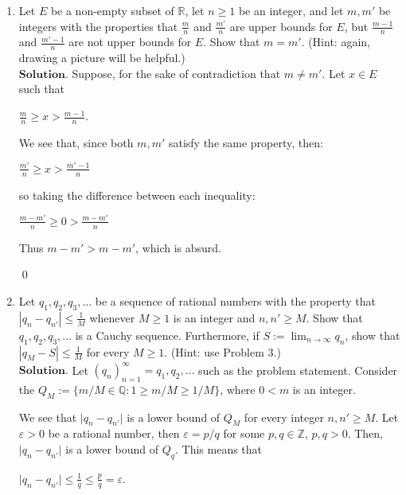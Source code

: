 \documentclass{article}
\theoremstyle{remark}
\begin{document}
\begin{enumerate}
            \item Let \( E \) be a non-empty subset of \( \mathbb{R} \), let \( n \geq 1 \) be an integer, and let \( m, m' \) be integers with the properties that \( \frac{m}{n} \) and \( \frac{m'}{n} \) are upper bounds for \( E \), but \( \frac{m - 1}{n} \) 
            and \( \frac{m' - 1}{n} \) are not upper bounds for \( E \). 
            Show that \( m = m' \). (Hint: again, drawing a picture will be helpful.)\\
            $\textbf{Solution.}$
            Suppose, for the sake of contradiction that $m \neq m'$.
            Let $x \in E$ such that 
            \begin{center}
                $\displaystyle \frac{m}{n} \geq x > \frac{m-1}{n}$.
            \end{center}
            We see that, since both $m, m'$ satisfy the same property, then:
            \begin{center}
                $\displaystyle \frac{m'}{n} \geq x > \frac{m'-1}{n}$
            \end{center}
            so taking the difference between each inequality:
            \begin{center}
                $\displaystyle \frac{m - m'}{n} \geq 0 > \frac{m-m'}{n}$
            \end{center}
            Thus $m-m' > m-m'$, which is absurd.
            \begin{flushright}
                \qed
            \end{flushright}

            \item Let \( q_1, q_2, q_3, \ldots \) be a sequence of rational numbers with the property that \( |q_n - q_{n'}| \leq \frac{1}{M} \) 
            whenever \( M \geq 1 \) is an integer and \( n, n' \geq M \). Show that \( q_1, q_2, q_3, \ldots \) is a Cauchy sequence. 
            Furthermore, if \( S := \lim_{n \to \infty} q_n \), show that \( |q_M - S| \leq \frac{1}{M} \) for every \( M \geq 1 \). (Hint: use Problem 3.)\\
            $\textbf{Solution.}$ 
            Let $(q_n)_{n=1}^{\infty} = q_1, q_2, \dots$ such as the problem statement.
            Consider the $Q_M := \{m/M \in \mathbb{Q}: 1 \geq m/M \geq 1/M\}$, where $0< m$ is an integer.
            
            We see that $\vert q_n - q_{n'}\vert$ is a lower bound of $Q_M$ for every integer $n,n' \geq M$.
            Let $\varepsilon > 0$ be a rational number, then $\varepsilon = p/q$ for some $p,q \in \mathbb{Z}$, $p,q>0$.
            Then, $\vert q_n - q_{n'} \vert$ is a lower bound of $Q_{q}$. This means that 
            \begin{center}
                $\displaystyle \vert q_n - q_{n'}\vert \leq \frac{1}{q} \leq \frac{p}{q} = \varepsilon$.
            \end{center}


\end{enumerate}
\end{document}
